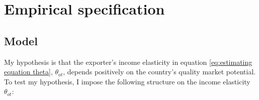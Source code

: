 \documentclass[12pt,a4paper,oneside,times]{article}   	%
\newtheorem{defn}{Definition}
\DeclareMathOperator{\dist}{dist}
\DeclareMathOperator{\GDPpc}{GDPpc}
\DeclareMathOperator{\MP}{QMP}
\begin{document}
\section{Empirical specification}\label{s: Empirical specific}



  


 

\subsection{Model}
My hypothesis is that the exporter's income elasticity in equation \eqref{eq:estimating equation theta}, $\theta_{ot}$, depends positively on the country's quality market potential.
To test my hypothesis, I impose the following structure on the income elasticity $\theta_{ot}$:
\end{document}
